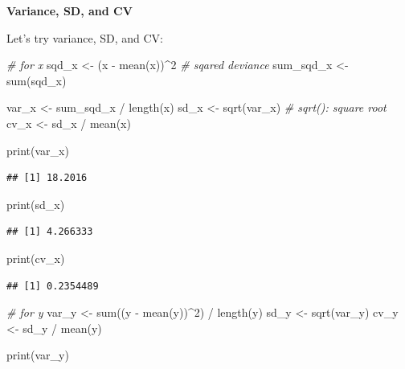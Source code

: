 \documentclass[
]{book}
\newenvironment{Shaded}{\begin{snugshade}}{\end{snugshade}}
\newcommand{\CommentTok}[1]{\textcolor[rgb]{0.56,0.35,0.01}{\textit{#1}}}
\newcommand{\DecValTok}[1]{\textcolor[rgb]{0.00,0.00,0.81}{#1}}
\newcommand{\FunctionTok}[1]{\textcolor[rgb]{0.00,0.00,0.00}{#1}}
\newcommand{\NormalTok}[1]{#1}
\newcommand{\OtherTok}[1]{\textcolor[rgb]{0.56,0.35,0.01}{#1}}
\newcommand{\SpecialCharTok}[1]{\textcolor[rgb]{0.00,0.00,0.00}{#1}}
\begin{document}
\textbf{Variance, SD, and CV}

Let's try variance, SD, and CV:

\begin{Shaded}
\begin{Highlighting}[]
\CommentTok{\# for x}
\NormalTok{sqd\_x }\OtherTok{\textless{}{-}}\NormalTok{ (x }\SpecialCharTok{{-}} \FunctionTok{mean}\NormalTok{(x))}\SpecialCharTok{\^{}}\DecValTok{2} \CommentTok{\# sqared deviance}
\NormalTok{sum\_sqd\_x }\OtherTok{\textless{}{-}} \FunctionTok{sum}\NormalTok{(sqd\_x)}

\NormalTok{var\_x }\OtherTok{\textless{}{-}}\NormalTok{ sum\_sqd\_x }\SpecialCharTok{/} \FunctionTok{length}\NormalTok{(x)}
\NormalTok{sd\_x }\OtherTok{\textless{}{-}} \FunctionTok{sqrt}\NormalTok{(var\_x) }\CommentTok{\# sqrt(): square root}
\NormalTok{cv\_x }\OtherTok{\textless{}{-}}\NormalTok{ sd\_x }\SpecialCharTok{/} \FunctionTok{mean}\NormalTok{(x)}

\FunctionTok{print}\NormalTok{(var\_x)}
\end{Highlighting}
\end{Shaded}

\begin{verbatim}
## [1] 18.2016
\end{verbatim}

\begin{Shaded}
\begin{Highlighting}[]
\FunctionTok{print}\NormalTok{(sd\_x)}
\end{Highlighting}
\end{Shaded}

\begin{verbatim}
## [1] 4.266333
\end{verbatim}

\begin{Shaded}
\begin{Highlighting}[]
\FunctionTok{print}\NormalTok{(cv\_x)}
\end{Highlighting}
\end{Shaded}

\begin{verbatim}
## [1] 0.2354489
\end{verbatim}

\begin{Shaded}
\begin{Highlighting}[]
\CommentTok{\# for y}
\NormalTok{var\_y }\OtherTok{\textless{}{-}} \FunctionTok{sum}\NormalTok{((y }\SpecialCharTok{{-}} \FunctionTok{mean}\NormalTok{(y))}\SpecialCharTok{\^{}}\DecValTok{2}\NormalTok{) }\SpecialCharTok{/} \FunctionTok{length}\NormalTok{(y)}
\NormalTok{sd\_y }\OtherTok{\textless{}{-}} \FunctionTok{sqrt}\NormalTok{(var\_y)}
\NormalTok{cv\_y }\OtherTok{\textless{}{-}}\NormalTok{ sd\_y }\SpecialCharTok{/} \FunctionTok{mean}\NormalTok{(y)}

\FunctionTok{print}\NormalTok{(var\_y)}
\end{Highlighting}
\end{Shaded}
\end{document}
